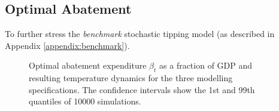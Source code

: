 \documentclass[../../main.tex]{subfiles}
\begin{document}
\subsection{Optimal Abatement} \label{section:abatement}

To further stress the  \textit{benchmark} stochastic tipping model (as described in Appendix \ref{appendix:benchmark}).

\begin{figure}[htbp]
    \centering
    
    \caption{Optimal abatement expenditure $\beta_t$ as a fraction of GDP and resulting temperature dynamics for the three modelling specifications. The confidence intervals show the 1st and 99th quantiles of 10000 simulations.}
    \label{fig:trajectory}
\end{figure}
\end{document}
